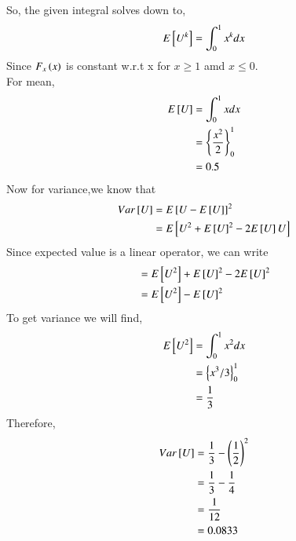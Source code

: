 \documentclass[journal,12pt,twocolumn]{IEEEtran}
\begin{document}
So, the given integral solves down to,
 \begin{equation}
	 E{}\left[U^k\right] = \int_{0}^{1}x^kdx
 \end{equation}
Since $F_{x}\left(x\right)$ is constant w.r.t x for $ x \geq 1 $ amd $ x \leq 0 $.\\
For mean,
  \begin{align}
	  E{}\left[U\right] &= \int_{0}^{1}xdx\\
	             &=\left\{ \frac{x^{2}}{2}\right\}_{0}^{1}\\ 
                     &= 0.5
  \end{align}
Now for variance,we know that
  \begin{align}
	  Var{}\left[U\right] &= E{}\left[U- E{}\left[U\right]\right]^2 \\
		       &= E{}\left[U^{2} + E{}\left[U\right]^{2} - 2E{}\left[U\right]U\right]\\
  \end{align}
  Since expected value is a linear operator, we can write
  \begin{align}
	               &= E{}\left[U^{2}\right] + E{}\left[U\right]^{2} - 2E{}\left[U\right]^{2}\\
                   &= E{}\left[U^{2}\right] - E{}\left[U\right]^{2} \label{eq:1-8}
  \end{align}
 To get variance we will find,
  \begin{align}
	  E{}\left[U^{2}\right] &= \int_{0}^{1}x^{2}dx\\
			 &=\left\{ x^{3}/3\right\}_{0}^{1}\\
			 &= \frac{1}{3}
  \end{align}
  Therefore,
  \begin{align}
	  Var{}\left[U\right] &= \frac{1}{3} -\left(\frac{1}{2}\right)^{2}\\
		       &= \frac{1}{3} - \frac{1}{4}\\
		       &= \frac{1}{12}\\
		       &= 0.0833
  \end{align}
\end{document}
